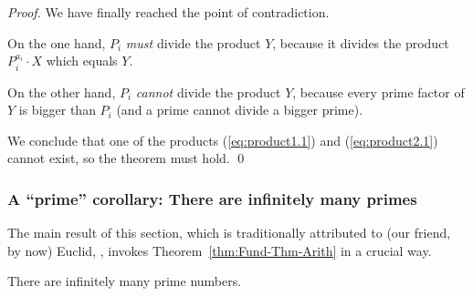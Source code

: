 \begin{proof}
We have finally reached the point of contradiction.

On the one hand, $P_i$ {\em must} divide the product $Y$, because it
divides the product $P_i^{a_i} \cdot X$ which equals $Y$.

On the other hand, $P_i$ {\em cannot} divide the product $Y$, because
every prime factor of $Y$ is bigger than $P_i$ (and a prime cannot
divide a bigger prime).

We conclude that one of the products (\ref{eq:product1.1}) and
(\ref{eq:product2.1}) cannot exist, so the theorem must hold.  \qed
\end{proof}


\subsubsection{A ``prime'' corollary: There are infinitely many primes}
\label{sec:infinite-primes}

The main result of this section, which is traditionally attributed to
(our friend, by now) Euclid, , invokes
Theorem~\ref{thm:Fund-Thm-Arith} in a crucial way.

\begin{prop}
\label{thm:infinite-primes}
There are infinitely many prime numbers.
\end{prop}

